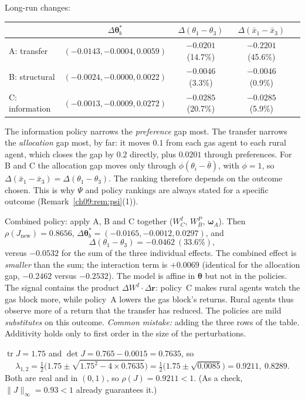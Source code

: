 \documentclass[../solutions_manual.tex]{subfiles}
\begin{document}
 Long-run changes:
\begin{center}
\begin{tabular}{lcccc}
\toprule
& $\Delta\boldsymbol{\theta}^*_b$ & $\Delta(\theta_1 - \theta_3)$ & $\Delta(\bar x_1 - \bar x_3)$ \\
\midrule
A: transfer & $(-0.0143, -0.0004, 0.0059)$ & $-0.0201$ (14.7\%) & $-0.2201$ (45.6\%) \\
B: structural & $(-0.0024, -0.0000, 0.0022)$ & $-0.0046$ (3.3\%) & $-0.0046$ (0.9\%) \\
C: information & $(-0.0013, -0.0009, 0.0272)$ & $-0.0285$ (20.7\%) & $-0.0285$ (5.9\%) \\
\bottomrule
\end{tabular}
\end{center}
The information policy narrows the \emph{preference} gap most. The transfer narrows the \emph{allocation} gap most, by far: it moves $0.1$ from each gas agent to each rural agent, which closes the gap by $0.2$ directly, plus $0.0201$ through preferences. For B and C the allocation gap moves only through $\phi(\theta_i - \bar\theta)$, with $\phi = 1$, so $\Delta(\bar x_1 - \bar x_3) = \Delta(\theta_1 - \theta_3)$. The ranking therefore depends on the outcome chosen. This is why $\Psi$ and policy rankings are always stated for a specific outcome (Remark~\ref{ch09:rem:psi}(1)).

 Combined policy: apply A, B and C together ($W^I_C$, $W^P_B$, $\boldsymbol{\omega}_A$). Then $\rho(J_{\text{new}}) = 0.8656$, $\Delta\boldsymbol{\theta}^*_b = (-0.0165, -0.0012, 0.0297)$, and
\[
\Delta(\theta_1 - \theta_3) = -0.0462\ (33.6\%),
\]
versus $-0.0532$ for the sum of the three individual effects.
The combined effect is \emph{smaller} than the sum; the interaction term is $+0.0069$ (identical for the allocation gap, $-0.2462$ versus $-0.2532$). The model is affine in $\boldsymbol{\theta}$ but not in the policies. The signal contains the product $\Delta W^I\cdot\Delta\mathbf{r}$: policy~C makes rural agents watch the gas block more, while policy~A lowers the gas block's returns. Rural agents thus observe more of a return that the transfer has reduced. The policies are mild \emph{substitutes} on this outcome. \textit{Common mistake:} adding the three rows of the table. Additivity holds only to first order in the size of the perturbations.

 $\operatorname{tr}J = 1.75$ and $\det J = 0.765 - 0.0015 = 0.7635$, so
\[
\lambda_{1,2} = \tfrac12\big(1.75 \pm \sqrt{1.75^2 - 4\times 0.7635}\big) = \tfrac12\big(1.75 \pm \sqrt{0.0085}\big) = 0.9211,\ 0.8289 .
\]
Both are real and in $(0,1)$, so $\rho(J) = 0.9211 < 1$. (As a check, $\|J\|_\infty = 0.93 < 1$ already guarantees it.)
\end{document}
